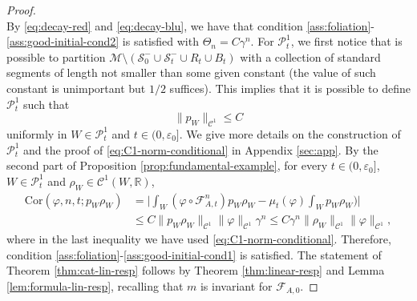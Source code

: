 \documentclass{amsart}
\numberwithin{equation}{section}
\newcommand\ve{\varepsilon}
\newcommand\vf{\varphi}
\renewcommand{\le}{\leqslant}
\newcommand\cC{{\mathcal C}}
\newcommand\cF{{\mathcal F}}
\newcommand\cM{{\mathcal M}}
\newcommand\cS{{\mathcal S}}
\newcommand\bR{{\mathbb R}}
\newcommand{\catt}{\cF_{A,t}}
\newcommand{\cato}{\cF_{A,0}}
\newcommand{\cov}{ \text{Cor} }
\begin{document}
\begin{proof}
\begin{equation}
\end{equation}
By \eqref{eq:decay-red} and \eqref{eq:decay-blu}, we have that condition \ref{ass:foliation}-\ref{ass:good-initial-cond2} is satisfied with \(\Theta_n = C\gamma^n\). For \(\mathscr P_t^1\), we first notice that is possible to partition \(\cM \setminus (\cS_0^{-} \cup \cS_t^{-} \cup R_t \cup B_t)\) with a collection of standard segments of length not smaller than some given constant (the value of such constant is unimportant but \(1/2\) suffices). This implies that it is possible to define \(\mathscr P_t^1\) such that 
\begin{equation}\label{eq:C1-norm-conditional}
\|p_W\|_{\cC^1} \le C
\end{equation}
 uniformly in \(W \in \mathscr P_t^1\) and \(t \in (0,\ve_0]\). We give more details on the construction of \(\mathscr P_t^1\) and the proof of \eqref{eq:C1-norm-conditional} in Appendix \ref{sec:app}. By the second part of Proposition \ref{prop:fundamental-example}, for every \(t \in (0,\ve_0]\), \(W \in \mathscr P_t^1\) and  \(\rho_W \in \cC^1 (W , \bR)\),
\[
\begin{split}
    \cov(\vf, n, t; p_W \rho_W ) &= \biggl| \int_{W}(\vf \circ \catt^n) p_W \rho_W  -  \mu_t(\vf) \int_{W}p_W \rho_W \biggr)\biggr| \\
&\le C \|p_W \rho_W\|_{\cC^1}\|\vf\|_{\cC^1}\gamma^n \le C \gamma^n \|\rho_W\|_{\cC^1}\|\vf\|_{\cC^1},
\end{split}
\]
where in the last inequality we have used \eqref{eq:C1-norm-conditional}. Therefore, condition \ref{ass:foliation}-\ref{ass:good-initial-cond1} is satisfied. The statement of Theorem \ref{thm:cat-lin-resp} follows by Theorem \ref{thm:linear-resp} and Lemma \ref{lem:formula-lin-resp}, recalling that \(m\) is invariant for \(\cato\).
\end{proof}
\end{document}
